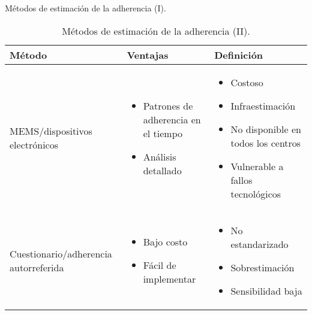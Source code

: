\begin{table}[ht]
\caption{Métodos de estimación de la adherencia (I).}
\end{table}

\begin{table}[ht]
	\centering
	\label{my-label}
	\begin{tabular}{|p{4cm}|p{5.5cm}|p{5.5cm}|}
		\hline
		\textbf{Método} & \textbf{Ventajas} & \textbf{Definición} \\ \hline
MEMS/dispositivos electrónicos & 
\begin{itemize}
	\item Patrones de adherencia en el tiempo
	\item Análisis detallado
\end{itemize} & 
\begin{itemize}
	\item Costoso
	\item Infraestimación
	\item No disponible en todos los centros
	\item Vulnerable a fallos tecnológicos
\end{itemize} \\ \hline
Cuestionario/adherencia autorreferida & 
\begin{itemize}
	\item Bajo costo
	\item Fácil de implementar
\end{itemize} & 
\begin{itemize}
	\item No estandarizado
	\item Sobrestimación
	\item Sensibilidad baja
\end{itemize} \\ \hline
	\end{tabular}

\caption{Métodos de estimación de la adherencia (II).}
\end{table}



